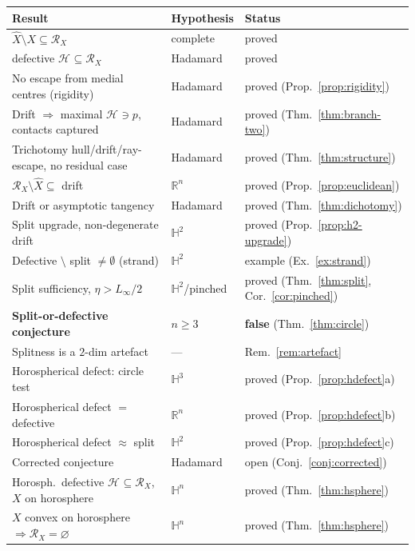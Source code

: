 \documentclass[11pt]{article}
\theoremstyle{remark}
\newcommand{\R}{\mathbb{R}}
\newcommand{\X}{X}
\newcommand{\Xhat}{\widehat{\X}}
\newcommand{\Rx}{\mathcal{R}_{\X}}
\newcommand{\Hb}[1]{\mathcal{H}_{#1}}
\begin{document}
\begin{center}
\begin{tabular}{lll}
\toprule
Result & Hypothesis & Status \\
\midrule
$\Xhat\setminus\X\subseteq\Rx$ & complete & proved \cite[Thm.~3.1]{R1} \\
defective $\Hb{}\subseteq\Rx$ & Hadamard & proved \cite[Thm.~4.1]{R1} \\
No escape from medial centres (rigidity) &
Hadamard & proved (Prop.~\ref{prop:rigidity}) \\
Drift $\Rightarrow$ maximal $\Hb{}\ni p$, contacts captured &
Hadamard & proved (Thm.~\ref{thm:branch-two}) \\
Trichotomy hull/drift/ray-escape, no residual case &
Hadamard & proved (Thm.~\ref{thm:structure}) \\
$\Rx\setminus\Xhat\subseteq$ drift & $\R^{n}$ & proved
(Prop.~\ref{prop:euclidean}) \\
Drift or asymptotic tangency & Hadamard & proved
(Thm.~\ref{thm:dichotomy}) \\
Split upgrade, non-degenerate drift & $\mathbb{H}^{2}$ & proved
(Prop.~\ref{prop:h2-upgrade}) \\
Defective $\setminus$ split $\neq\emptyset$ (strand) &
$\mathbb{H}^{2}$ & example (Ex.~\ref{ex:strand}) \\
Split sufficiency, $\eta>L_{\infty}/2$ & $\mathbb{H}^{2}$/pinched &
proved (Thm.~\ref{thm:split}, Cor.~\ref{cor:pinched}) \\
\midrule
\textbf{Split-or-defective conjecture} & $n\ge3$ &
\textbf{false} (Thm.~\ref{thm:circle}) \\
Splitness is a $2$-dim artefact & --- & Rem.~\ref{rem:artefact} \\
Horospherical defect: circle test & $\mathbb{H}^{3}$ & proved
(Prop.~\ref{prop:hdefect}a) \\
Horospherical defect $=$ defective & $\R^{n}$ & proved
(Prop.~\ref{prop:hdefect}b) \\
Horospherical defect $\approx$ split & $\mathbb{H}^{2}$ & proved
(Prop.~\ref{prop:hdefect}c) \\
Corrected conjecture & Hadamard & open
(Conj.~\ref{conj:corrected}) \\
\midrule
Horosph.\ defective $\Hb{}\subseteq\Rx$, $\X$ on horosphere &
$\mathbb{H}^{n}$ & proved (Thm.~\ref{thm:hsphere}) \\
$\X$ convex on horosphere $\Rightarrow\Rx=\varnothing$ &
$\mathbb{H}^{n}$ & proved (Thm.~\ref{thm:hsphere}) \\

\end{tabular}
\end{center}
\end{document}
